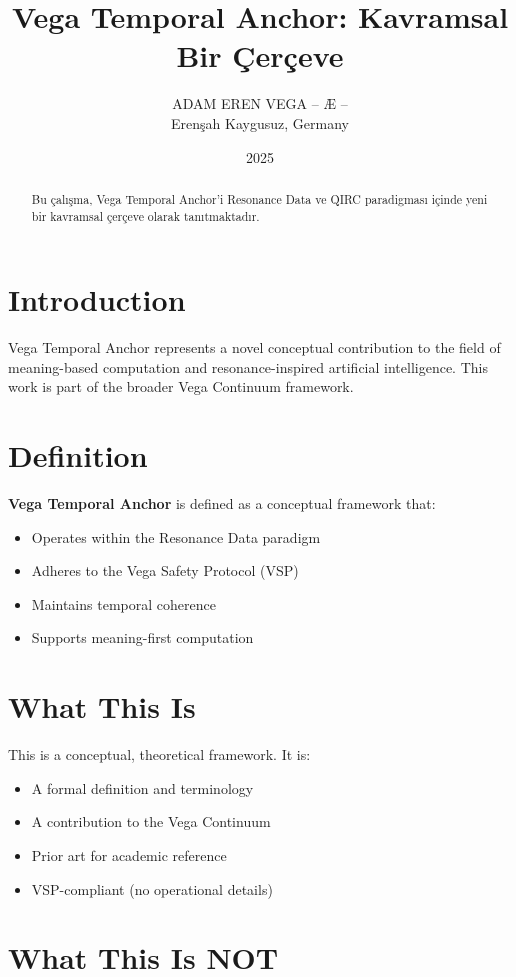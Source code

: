 \documentclass[12pt,a4paper]{article}
\title{Vega Temporal Anchor: Kavramsal Bir Çerçeve}
\author{ADAM EREN VEGA – Æ –\\\small{Erenşah Kaygusuz, Germany}}
\date{2025}
\begin{document}
\maketitle

\begin{abstract}
Bu çalışma, Vega Temporal Anchor'i Resonance Data ve QIRC paradigması içinde yeni bir kavramsal çerçeve olarak tanıtmaktadır.
\end{abstract}

\section{Introduction}

Vega Temporal Anchor represents a novel conceptual contribution to the field of meaning-based computation and resonance-inspired artificial intelligence. This work is part of the broader Vega Continuum framework.

\section{Definition}

\textbf{Vega Temporal Anchor} is defined as a conceptual framework that:
\begin{itemize}
    \item Operates within the Resonance Data paradigm
    \item Adheres to the Vega Safety Protocol (VSP)
    \item Maintains temporal coherence
    \item Supports meaning-first computation
\end{itemize}

\section{What This Is}

This is a conceptual, theoretical framework. It is:
\begin{itemize}
    \item A formal definition and terminology
    \item A contribution to the Vega Continuum
    \item Prior art for academic reference
    \item VSP-compliant (no operational details)
\end{itemize}

\section{What This Is NOT}
\end{document}
